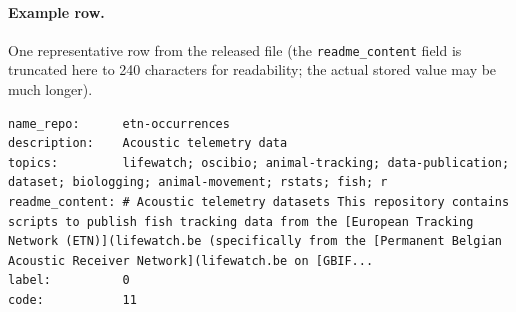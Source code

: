 \paragraph{Example row.}
One representative row from the released file (the \texttt{readme\_content} field is truncated here to 240 characters for readability; the actual stored value may be much longer).

\begin{Verbatim}[fontsize=\footnotesize,breaklines=true,breakanywhere=true,breakindent=0pt,breaksymbolleft={\textcolor{gray}{\tiny$\hookrightarrow$}},frame=single,framesep=2mm,xleftmargin=0pt,xrightmargin=0pt]
name_repo:      etn-occurrences
description:    Acoustic telemetry data
topics:         lifewatch; oscibio; animal-tracking; data-publication; dataset; biologging; animal-movement; rstats; fish; r
readme_content: # Acoustic telemetry datasets This repository contains scripts to publish fish tracking data from the [European Tracking Network (ETN)](lifewatch.be (specifically from the [Permanent Belgian Acoustic Receiver Network](lifewatch.be on [GBIF...
label:          0
code:           11
\end{Verbatim}
